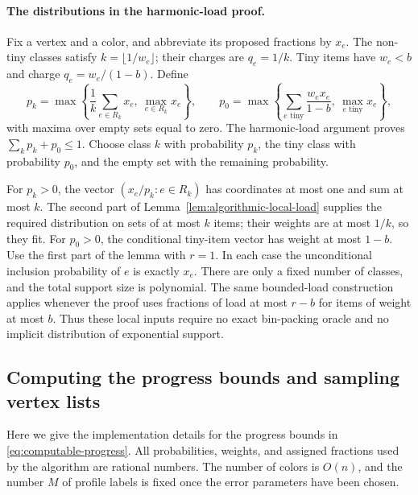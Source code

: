 \documentclass[11pt]{article}
\theoremstyle{definition}\newtheorem{algorithm}{Algorithm}[section]
\numberwithin{equation}{section}
\theoremstyle{remark}\newtheorem*{remark}{Remark}
\begin{document}
\paragraph{The distributions in the harmonic-load proof.}
Fix a vertex and a color, and abbreviate its proposed fractions by
$x_e$. The non-tiny classes satisfy $k=\lfloor1/w_e\rfloor$; their
charges are $q_e=1/k$. Tiny items have $w_e<b$ and charge
$q_e=w_e/(1-b)$. Define
\[
 p_k=\max\left\{\frac1k\sum_{e\in R_k}x_e,\ \max_{e\in R_k}x_e\right\},
 \qquad
 p_0=\max\left\{\sum_{e\text{ tiny}}\frac{w_e x_e}{1-b},
                          \ \max_{e\text{ tiny}}x_e\right\},
\]
with maxima over empty sets equal to zero.
The harmonic-load argument proves $\sum_k p_k+p_0\le1$.
Choose class $k$ with probability $p_k$, the tiny class with probability
$p_0$, and the empty set with the remaining probability.

For $p_k>0$, the vector $(x_e/p_k:e\in R_k)$ has coordinates at most
one and sum at most $k$. The second part of
Lemma~\ref{lem:algorithmic-local-load} supplies the required distribution
on sets of at most $k$ items; their weights are at most $1/k$, so they fit.
For $p_0>0$, the conditional tiny-item vector has weight at most $1-b$.
Use the first part of the lemma with $r=1$. In each case the unconditional
inclusion probability of $e$ is exactly $x_e$. There are only a fixed
number of classes, and the total support size is polynomial.
The same bounded-load construction applies whenever the proof uses
fractions of load at most $r-b$ for items of weight at most $b$.
Thus these local inputs require no exact bin-packing oracle and no
implicit distribution of exponential support.
\subsection{Computing the progress bounds and sampling vertex lists}
\label{sec:computable-progress}

Here we give the implementation details for the progress bounds in
\eqref{eq:computable-progress}. All probabilities, weights, and assigned
fractions used by the algorithm are rational numbers. The number of
colors is $O(n)$, and the number $M$ of profile labels is fixed once
the error parameters have been chosen.
\end{document}
